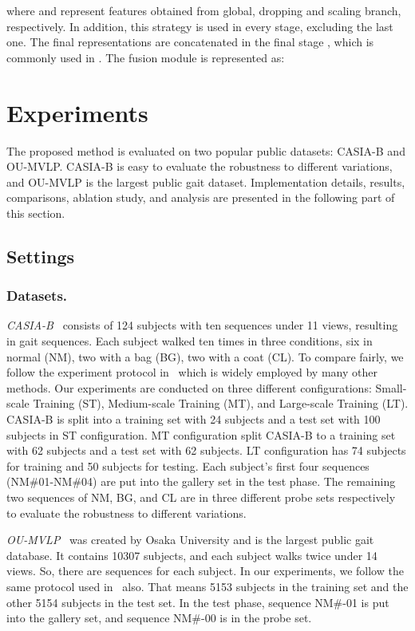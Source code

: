 \documentclass[runningheads]{llncs}
\begin{document}
where  and  represent features obtained from global, dropping and scaling branch, respectively. In addition, this strategy is used in every stage, excluding the last one. The final representations are concatenated in the final stage , which is commonly used in \cite{gaitgl,cstl,gln}. The fusion module is represented as:
    
    



\section{Experiments}
The proposed method is evaluated on two popular public datasets: CASIA-B and OU-MVLP. CASIA-B is easy to evaluate the robustness to different variations, and OU-MVLP is the largest public gait dataset. Implementation details, results, comparisons, ablation study, and analysis are presented in the following part of this section. 



\subsection{Settings}

\subsubsection{Datasets.}
\textit{CASIA-B}~\cite{casiab} consists of 124 subjects with ten sequences under 11 views, resulting in  gait sequences. Each subject walked ten times in three conditions, \ie six in normal (NM), two with a bag (BG),  two with a coat (CL). To compare fairly, we follow the experiment protocol in~\cite{aaai2019gaitset} which is widely employed by many other methods. Our experiments are conducted on three different configurations: Small-scale Training (ST), Medium-scale Training (MT), and Large-scale Training (LT). CASIA-B is split into a training set with 24 subjects and a test set with 100 subjects in ST configuration. MT configuration split CASIA-B to a training set with 62 subjects and a test set with 62 subjects. LT configuration has 74 subjects for training and 50 subjects for testing. Each subject's first four sequences (NM\#01-NM\#04) are put into the gallery set in the test phase. The remaining two sequences of NM, BG, and CL are in three different probe sets respectively to evaluate the robustness to different variations.

\textit{OU-MVLP}~\cite{oumvlp} was created by Osaka University and is the largest public gait database. It contains 10307 subjects, and each subject walks twice under 14 views. So, there are   sequences for each subject. In our experiments, we follow the same protocol used in~\cite{aaai2019gaitset} also. That means 5153 subjects in the training set and the other 5154 subjects in the test set. In the test phase, sequence NM\#-01 is put into the gallery set, and sequence NM\#-00 is in the probe set.
\end{document}
